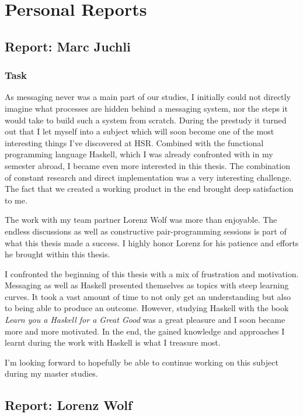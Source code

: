 \chapter{Personal Reports}

\section*{Report: Marc Juchli}

\subsection*{Task}

As messaging never was a main part of our studies, I initially could not
directly imagine what processes are hidden behind a messaging system, nor the
steps it would take to build such a system from scratch.  During the prestudy it
turned out that I let myself into a subject which will soon become one of the
most interesting things I've discovered at HSR. Combined with the functional
programming language Haskell, which I was already confronted with in my semester
abroad, I became even more interested in this thesis. The combination of
constant research and direct implementation was a very interesting challenge.
The fact that we created a working product in the end brought deep satisfaction
to me.

The work with my team partner Lorenz Wolf was more than enjoyable. The endless
discussions as well as constructive pair-programming sessions is part of what
this thesis made a success. I highly honor Lorenz for his patience and efforts
he brought within this thesis.

I confronted the beginning of this thesis with a mix of frustration and
motivation. Messaging as well as Haskell presented themselves as topics with
steep learning curves. It took a vast amount of time to not only get an
understanding but also to being able to produce an outcome.  However, studying
Haskell with the book \textit{Learn you a Haskell for a Great Good} was a great
pleasure and I soon became more and more motivated.  In the end, the gained
knowledge and approaches I learnt during the work with Haskell is what I
treasure most.

I'm looking forward to hopefully be able to continue working on this subject
during my master studies.


\section*{Report: Lorenz Wolf}

